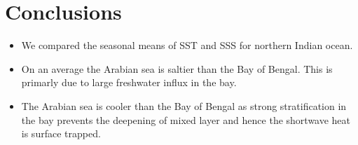 \documentclass[20pt]{article}
\begin{document}
\section*{Conclusions}

\begin{itemize}
    \item We compared the seasonal means of SST and SSS for northern Indian ocean.
    \item On an average the Arabian sea is saltier than the Bay of Bengal. This is primarly due to large freshwater influx in the bay.
    \item The Arabian sea is cooler than the Bay of Bengal as strong stratification in the bay prevents the deepening of mixed layer and hence the shortwave heat is surface trapped.
\end{itemize}
\end{document}
